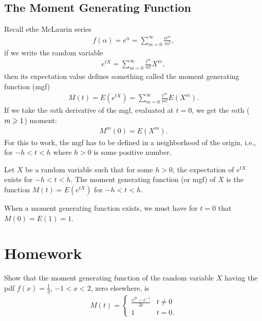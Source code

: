 \subsection{The Moment Generating Function}
Recall ethe McLaurin series
\begin{align*}
    f(\alpha)=e^{\alpha}=\sum\limits_{m=0}^{\infty}\frac{\alpha^m}{m!},
\end{align*}
if we write the random variable
\begin{align*}
    e^{tX}=\sum\limits_{m=0}^{\infty}\frac{t^m}{m!}X^m,
\end{align*}
then its expectation value defines something called the moment generating function (mgf)
\begin{align*}
    M(t)=E(e^{tX})=\sum\limits_{m=0}^{\infty} \frac{t^m}{m!}E(X^m).
\end{align*}
If we take the $m$th derivative of the mgf,
evaluated at $t=0$, we get the $m$th ($m\geqslant 1$) moment:
\begin{align*}
    M^{m}(0)=E(X^m).
\end{align*}
For this to work, the mgf has to be defined in a neighborhood of the origin,
i.e., for $-h<t<h$ where $h>0$
is some positive number. 

\begin{definition}{}{}
    Let $X$ be a random variable such that for some $h>0$,
    the expectation of $e^{tX}$ exists for $-h<t<h$.
    The moment generating function (or mgf) of $X$ is the function $M(t)=E(e^{tX})$ for $-h<t<h$.
\end{definition}
\begin{remark}
    When a moment generating function exists, we must have for $t=0$
    that $M(0)=E(1)=1$.
\end{remark}

\section{Homework}

\begin{exercise}{}{}
    Show that the moment generating function of the random variable $X$
    having the pdf $f(x)=\frac{1}{3}$, $-1<x<2$, zero elsewhere, is
    \begin{align*}
        M(t) = \left\{\begin{matrix}
            \frac{e^{2t}-e^{-t}}{3t} & t\neq 0\\
            1 & t=0.
           \end{matrix}\right.
    \end{align*}
\end{exercise}


